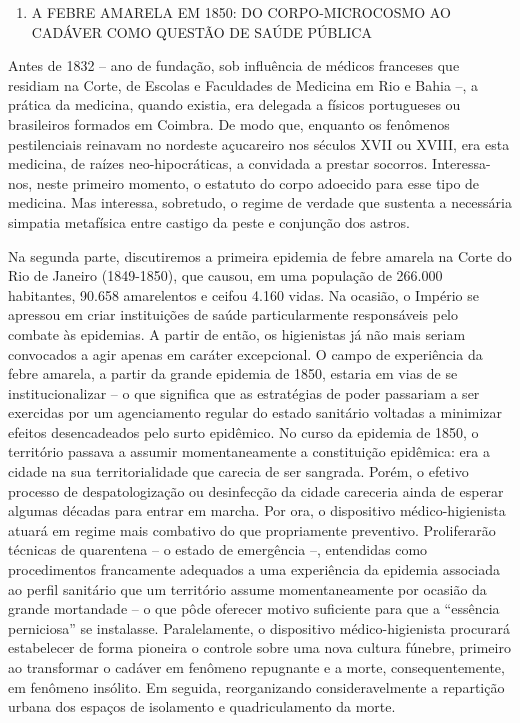 \begin{enumerate}
\def\labelenumi{\arabic{enumi}.}
\setcounter{enumi}{2}
\tightlist
\item
  A FEBRE AMARELA EM 1850: DO CORPO-MICROCOSMO AO CADÁVER COMO QUESTÃO
  DE SAÚDE PÚBLICA
\end{enumerate}

Antes de 1832 -- ano de fundação, sob influência de médicos franceses
que residiam na Corte, de Escolas e Faculdades de Medicina em Rio e
Bahia --, a prática da medicina, quando existia, era delegada a físicos
portugueses ou brasileiros formados em Coimbra. De modo que, enquanto os
fenômenos pestilenciais reinavam no nordeste açucareiro nos séculos XVII
ou XVIII, era esta medicina, de raízes neo-hipocráticas, a convidada a
prestar socorros. Interessa-nos, neste primeiro momento, o estatuto do
corpo adoecido para esse tipo de medicina. Mas interessa, sobretudo, o
regime de verdade que sustenta a necessária simpatia metafísica entre
castigo da peste e conjunção dos astros.

Na segunda parte, discutiremos a primeira epidemia de febre amarela na
Corte do Rio de Janeiro (1849-1850), que causou, em uma população de
266.000 habitantes, 90.658 amarelentos e ceifou 4.160 vidas. Na ocasião,
o Império se apressou em criar instituições de saúde particularmente
responsáveis pelo combate às epidemias. A partir de então, os
higienistas já não mais seriam convocados a agir apenas em caráter
excepcional. O campo de experiência da febre amarela, a partir da grande
epidemia de 1850, estaria em vias de se institucionalizar -- o que
significa que as estratégias de poder passariam a ser exercidas por um
agenciamento regular do estado sanitário voltadas a minimizar efeitos
desencadeados pelo surto epidêmico. No curso da epidemia de 1850, o
território passava a assumir momentaneamente a constituição epidêmica:
era a cidade na sua territorialidade que carecia de ser sangrada. Porém,
o efetivo processo de despatologização ou desinfecção da cidade
careceria ainda de esperar algumas décadas para entrar em marcha. Por
ora, o dispositivo médico-higienista atuará em regime mais combativo do
que propriamente preventivo. Proliferarão técnicas de quarentena -- o
estado de emergência --, entendidas como procedimentos francamente
adequados a uma experiência da epidemia associada ao perfil sanitário
que um território assume momentaneamente por ocasião da grande
mortandade -- o que pôde oferecer motivo suficiente para que a
``essência perniciosa'' se instalasse. Paralelamente, o dispositivo
médico-higienista procurará estabelecer de forma pioneira o controle
sobre uma nova cultura fúnebre, primeiro ao transformar o cadáver em
fenômeno repugnante e a morte, consequentemente, em fenômeno insólito.
Em seguida, reorganizando consideravelmente a repartição urbana dos
espaços de isolamento e quadriculamento da morte.

